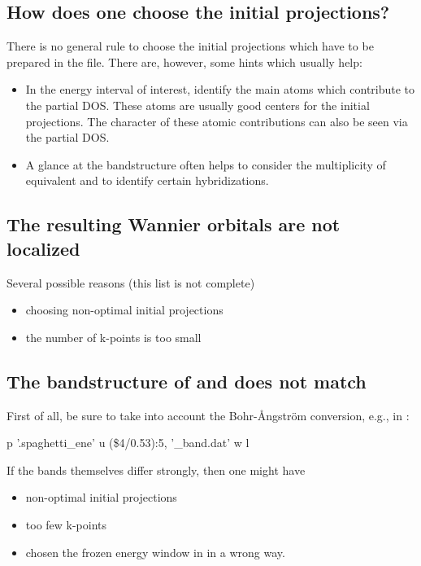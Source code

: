 \subsection{How does one choose the initial projections?}
There is no general rule to choose the initial projections which have
to be prepared in the  file. There are, however, some hints
which usually help:
\begin{itemize}
\item In the energy interval of interest, identify the main atoms
  which contribute to the partial DOS. These atoms are usually good
  centers for the initial projections. The character of these atomic
  contributions can also be seen via the partial DOS.
\item A glance at the bandstructure often helps to consider the
  multiplicity of equivalent \wf and to identify certain
  hybridizations.
\end{itemize}

\subsection{The resulting Wannier orbitals are not localized}
Several possible reasons (this list is not complete)
\begin{itemize}
\item choosing non-optimal initial projections
\item the number of k-points is too small
\end{itemize}

\subsection{The bandstructure of \wien and \wannier does not match}
First of all, be sure to take into account the Bohr-Ångström
conversion, e.g., in :
\begin{usage}
  p '\case.spaghetti\_ene' u (\$4/0.53):5, '\case{}\_band.dat' w l
\end{usage}

If the bands themselves differ strongly, then one might have
\begin{itemize}
 \item non-optimal initial projections
 \item too few k-points
 \item chosen the frozen energy window in \wannier in a wrong way.
\end{itemize}

